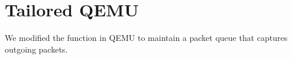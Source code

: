 \section{Tailored QEMU} \label{sec:qemu}

We modified the \taprecv function in QEMU to maintain a packet queue that 
captures outgoing packets. 
